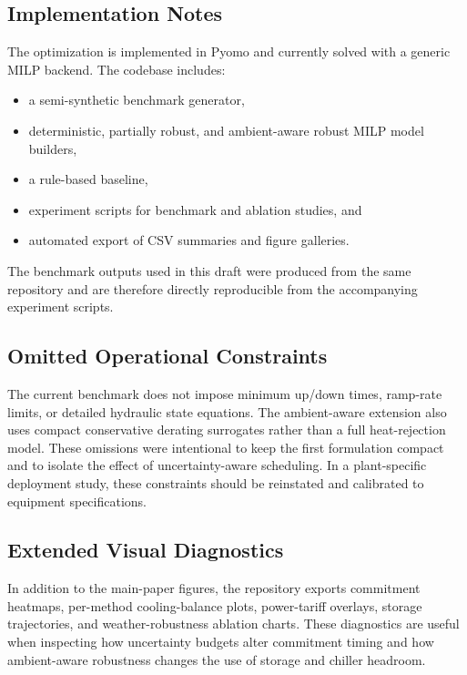 \subsection{Implementation Notes}

The optimization is implemented in Pyomo and currently solved with a generic MILP backend. The codebase includes:
\begin{itemize}[leftmargin=1.5em]
    \item a semi-synthetic benchmark generator,
    \item deterministic, partially robust, and ambient-aware robust MILP model builders,
    \item a rule-based baseline,
    \item experiment scripts for benchmark and ablation studies, and
    \item automated export of CSV summaries and figure galleries.
\end{itemize}

The benchmark outputs used in this draft were produced from the same repository and are therefore directly reproducible from the accompanying experiment scripts.

\subsection{Omitted Operational Constraints}

The current benchmark does not impose minimum up/down times, ramp-rate limits, or detailed hydraulic state equations. The ambient-aware extension also uses compact conservative derating surrogates rather than a full heat-rejection model. These omissions were intentional to keep the first formulation compact and to isolate the effect of uncertainty-aware scheduling. In a plant-specific deployment study, these constraints should be reinstated and calibrated to equipment specifications.

\subsection{Extended Visual Diagnostics}

In addition to the main-paper figures, the repository exports commitment heatmaps, per-method cooling-balance plots, power-tariff overlays, storage trajectories, and weather-robustness ablation charts. These diagnostics are useful when inspecting how uncertainty budgets alter commitment timing and how ambient-aware robustness changes the use of storage and chiller headroom.

